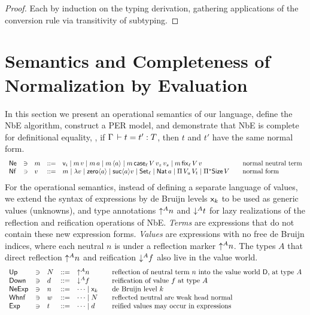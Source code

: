 \documentclass[acmlarge,review,anonymous]{acmart}\settopmatter{printfolios=true}
\begin{document}
\begin{proof}
  Each by induction on the typing derivation, gathering applications of the conversion rule via transitivity of subtyping.
\end{proof}



\section{Semantics and Completeness of Normalization by Evaluation}
\label{sec:sem}

In this section we present an operational semantics of our language,
define the NbE algorithm, construct a PER model, and demonstrate that
NbE is complete for definitional equality, \ie, if
$\Gamma \,\vdash t = t' : T$, then $t$ and $t'$ have the same normal form.
\[
\begin{array}{lllll@{\qquad}l}
  \Ne & \ni &
  m & ::= & \ind i \mid m\,v \mid m\,a \mid m\,\ann a \mid
            m\,\case[\ell] V{v_z}{v_s} \mid m\,\fix[\ell] V v
    & \mbox{normal neutral term} \\
  \Nf & \ni &
  v & ::= & m \mid \lambda v \mid \zero a \mid \suc a v \mid
            \Set[\ell] \mid \Nat a \mid \piT {V_u}{V_t} \mid
            \epiT\Size V
    & \mbox{normal form} \\
\end{array}
\]
For the operational semantics,
instead of defining a separate language of values,
we extend the syntax of expressions by de Bruijn levels $\mathsf{x}_{k}$
to be used as generic values (unknowns), and type annotations
$\mathord{\uparrow^{A}} n$ and $\mathord{\downarrow^{A}} t$ for lazy realizations of the
reflection and reification operations of NbE.
\emph{Terms} are expressions that do not contain these new expression
forms. \emph{Values}  are expressions with no free de Bruijn
indices, where each neutral $n$ is under a reflection marker $\mathord{\uparrow^{A}} n$.
The types $A$ that direct reflection $\mathord{\uparrow^{A}} n$ and reification
$\mathord{\downarrow^{A}} f$ also live in the value world.
\[
\begin{array}{lllrl@{\qquad}l}
  \tUp  & \ni & N & ::= & \up A n
     & \mbox{reflection of neutral term $n$ into the value world $\D$, at
       type $A$} \\
  \tDown & \ni & d & ::= & \down A f
     & \mbox{reification of value $f$ at type $A$} \\
  \NeExp & \ni & n & ::= & \dots \mid \lev k
    & \mbox{de Bruijn level $k$} \\
  \Whnf & \ni & w & ::= & \dots \mid N
    & \mbox{reflected neutral are weak head normal} \\
  \Exp  & \ni & t & ::= & \dots \mid d
    & \mbox{reified values may occur in expressions} \\
\end{array}
\]
\end{document}
